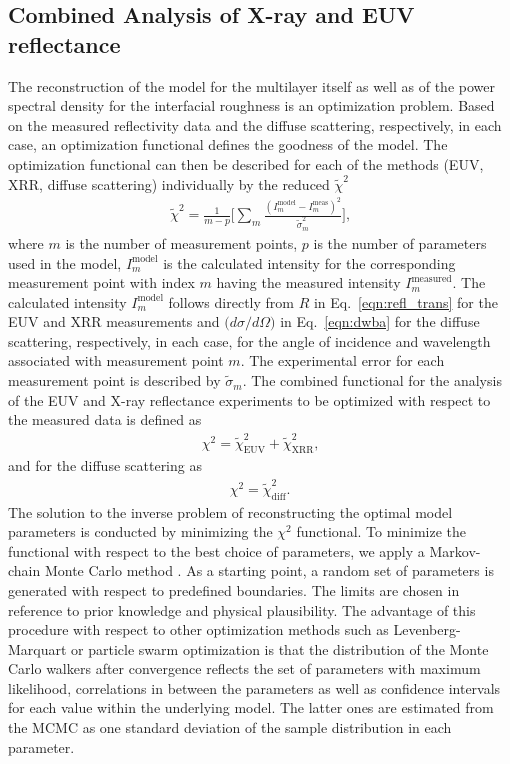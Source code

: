 \subsection{Combined Analysis of X-ray and EUV reflectance}
The reconstruction of the model for the multilayer itself as well as of the power spectral density for the interfacial roughness is an optimization problem. Based on the measured reflectivity data and the diffuse scattering, respectively, in each case, an optimization functional defines the goodness of the model. The optimization functional can then be described for each of the methods (EUV, XRR, diffuse scattering) individually by the reduced $\tilde{\chi}^2$
\begin{align}
\tilde{\chi}^2 = \frac{1}{m - p} \bigg[\sum\limits_{m} \frac{(I_m^\text{model} 
- I_m^\text{meas})^2}{\tilde{\sigma}_m^2} \bigg] \text{,} 
\label{eqn:reduced_chi_2}
\end{align}
where $m$ is the number of measurement points, $p$ is the number of parameters used in the model, $I_m^\text{model}$ is the calculated intensity for the corresponding measurement point with index $m$ having the measured intensity $I_m^\text{measured}$. The calculated intensity $I_m^\text{model}$ follows directly from $R$ in Eq.~\eqref{eqn:refl_trans} for the EUV and XRR measurements and $\big(d \sigma/d \Omega\big)$ in Eq.~\eqref{eqn:dwba} for the diffuse scattering, respectively, in each case, for the angle of incidence and wavelength associated with measurement point $m$. The experimental error for each measurement point is described by $\tilde{\sigma}_m$. The combined functional for the analysis of the EUV and X-ray reflectance experiments to be optimized with respect to the measured data is defined as
\begin{align}
\chi^2 = \tilde{\chi}^2_\text{EUV} +\tilde{\chi}^2_\text{XRR} \text{,}
\label{eqn:total_chi_2}
\end{align}
and for the diffuse scattering as
\begin{align}
\chi^2 = \tilde{\chi}^2_\text{diff} \text{.} \label{eqn:total_chi_2_diffuse}
\end{align}
The solution to the inverse problem of reconstructing the optimal model parameters is conducted by minimizing the $\chi^2$ functional. To minimize the functional with respect to the best choice of parameters, we apply a Markov-chain Monte Carlo method \cite{goodman_ensemble_2010,foreman-mackey_emcee:_2013,haase_multiparameter_2016}. As a starting point, a random set of parameters is generated with respect to predefined boundaries. The limits are chosen in reference to prior knowledge and physical plausibility. The advantage of this procedure with respect to other optimization methods such as Levenberg-Marquart \cite{levenberg_method_1944,marquardt_algorithm_1963} or particle swarm optimization \cite{kennedy_particle_2011} is that the distribution of the Monte Carlo walkers after convergence reflects the set of parameters with maximum likelihood, correlations in between the parameters as well as confidence intervals for each value within the underlying model. The latter ones are estimated from the MCMC as one standard deviation of the sample distribution in each parameter.
